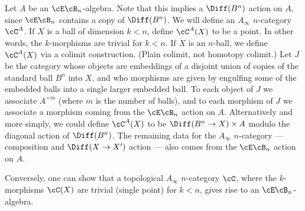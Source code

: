 \begin{example}[$E_n$ algebras]
\rm
\label{ex:e-n-alg}

Let $A$ be an $\cE\cB_n$-algebra.
Note that this implies a $\Diff(B^n)$ action on $A$, 
since $\cE\cB_n$ contains a copy of $\Diff(B^n)$.
We will define an $A_\infty$ $n$-category $\cC^A$.
If $X$ is a ball of dimension $k<n$, define $\cC^A(X)$ to be a point.
In other words, the $k$-morphisms are trivial for $k<n$.
If $X$ is an $n$-ball, we define $\cC^A(X)$ via a colimit construction.
(Plain colimit, not homotopy colimit.)
Let $J$ be the category whose objects are embeddings of a disjoint union of copies of 
the standard ball $B^n$ into $X$, and who morphisms are given by engulfing some of the 
embedded balls into a single larger embedded ball.
To each object of $J$ we associate $A^{\times m}$ (where $m$ is the number of balls), and
to each morphism of $J$ we associate a morphism coming from the $\cE\cB_n$ action on $A$.
Alternatively and more simply, we could define $\cC^A(X)$ to be 
$\Diff(B^n\to X)\times A$ modulo the diagonal action of $\Diff(B^n)$.
The remaining data for the $A_\infty$ $n$-category 
--- composition and $\Diff(X\to X')$ action ---
also comes from the $\cE\cB_n$ action on $A$.


Conversely, one can show that a topological $A_\infty$ $n$-category $\cC$, where the $k$-morphisms
$\cC(X)$ are trivial (single point) for $k<n$, gives rise to 
an $\cE\cB_n$-algebra.
\end{example}


